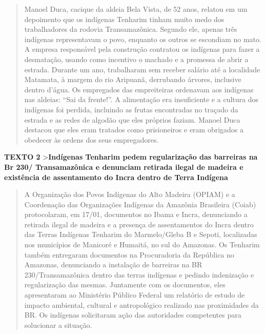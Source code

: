 \begin{quote}
Manoel Duca, cacique da aldeia Bela Vista, de 52 anos, relatou em um
depoimento que os indígenas Tenharim tinham muito medo dos trabalhadores
da rodovia Transamazônica. Segundo ele, apenas três indígenas
representavam o povo, enquanto os outros se escondiam no mato. A empresa
responsável pela construção contratou os indígenas para fazer a
desmatação, usando como incentivo o machado e a promessa de abrir a
estrada. Durante um ano, trabalharam sem receber salário até a
localidade Matamata, à margem do rio Aripuanã, derrubando árvores,
inclusive dentro d'água. Os empregados das empreiteiras ordenavam aos
indígenas nas aldeias: ``Sai da frente!''. A alimentação era
insuficiente e a cultura dos indígenas foi perdida, incluindo as frutas
encontradas no traçado da estrada e as redes de algodão que eles
próprios faziam. Manoel Duca destacou que eles eram tratados como
prisioneiros e eram obrigados a obedecer às ordens dos seus
empregadores.
\end{quote}


\textbf{TEXTO 2}
\textgreater{}\textbf{Indígenas Tenharim pedem regularização das barreiras na Br 230/ Transamazônica e denunciam retirada ilegal de madeira e existência de assentamento do Incra dentro de Terra Indígena}

\begin{quote}
A Organização dos Povos Indígenas do Alto Madeira (OPIAM) e a
Coordenação das Organizações Indígenas da Amazônia Brasileira (Coiab)
protocolaram, em 17/01, documentos no Ibama e Incra, denunciando a
retirada ilegal de madeira e a presença de assentamentos do Incra dentro
das Terras Indígenas Tenharim do Marmelo/Gleba B e Sepoti, localizadas
nos municípios de Manicoré e Humaitá, no sul do Amazonas. Os Tenharim
também entregaram documentos na Procuradoria da República no Amazonas,
denunciando a instalação de barreiras na BR 230/Transamazônica dentro
das terras indígenas e pedindo indenização e regularização das mesmas.
Juntamente com os documentos, eles apresentaram ao Ministério Público
Federal um relatório de estudo de impacto ambiental, cultural e
antropológico realizado nas proximidades da BR. Os indígenas solicitaram
ação das autoridades competentes para solucionar a situação.
\end{quote}

